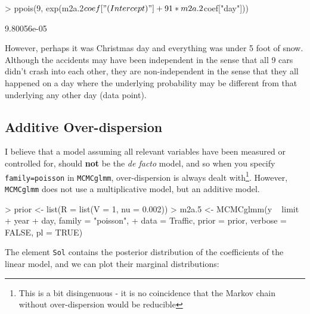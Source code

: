\documentclass{article}
\begin{document}
\begin{Schunk}
\begin{Sinput}
> ppois(9, exp(m2a.2$coef["(Intercept)"] + 91 * m2a.2$coef["day"]))
\end{Sinput}
\begin{Soutput}
[1] 9.80056e-05
\end{Soutput}
\end{Schunk}

However, perhaps it was Christmas day and everything was under 5 foot of snow. Although the accidents may have been independent in the sense that all 9 cars didn't crash into each other, they are non-independent in the sense that they all happened on a day where the underlying probability may be different from that underlying any other day (data point).  

\subsection{Additive Over-dispersion}
\label{addod-sec}

I believe that a model assuming all relevant variables have been measured or controlled for, should {\bf not} be the \emph{de facto} model, and so when you specify \texttt{family=poisson} in \texttt{MCMCglmm}, over-dispersion is always dealt with\footnote{This is a bit disingenuous - it is no coincidence that the Markov chain without over-dispersion would be reducible}. However, \texttt{MCMCglmm} does not use a multiplicative model, but an additive model. 

\begin{Schunk}
\begin{Sinput}
> prior <- list(R = list(V = 1, nu = 0.002))
> m2a.5 <- MCMCglmm(y ~ limit + year + day, family = "poisson", 
+     data = Traffic, prior = prior, verbose = FALSE, pl = TRUE)
\end{Sinput}
\end{Schunk}

The element \texttt{Sol} contains the posterior distribution of the coefficients of the linear model, and we can plot their marginal distributions:
\end{document}
